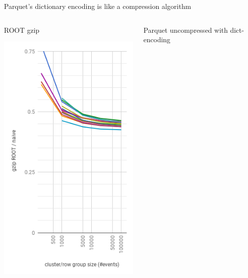 \documentclass[aspectratio=169]{beamer}
\begin{document}
\begin{frame}{Parquet's dictionary encoding is like a compression algorithm}
\begin{columns}
\begin{center}
\mbox{\hspace{3 cm}}
ROOT gzip

\includegraphics[width=\linewidth]{root-gzip-2.png}
\end{center}
\begin{center}
Parquet uncompressed
with dict-encoding


\end{center}
\end{columns}
\end{frame}
\end{document}
